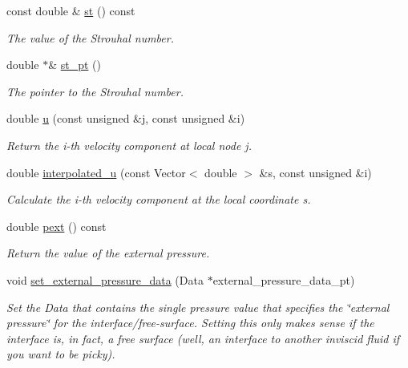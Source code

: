 \begin{DoxyCompactItemize}
const double \& \hyperlink{classoomph_1_1FluidInterfaceElement_a0c55c0e3cff597363ecb9ab0869c0015}{st} () const
\begin{DoxyCompactList}\small\item\em The value of the Strouhal number. \end{DoxyCompactList}\item 
double $\ast$\& \hyperlink{classoomph_1_1FluidInterfaceElement_a3fa462bb0ff807cf655ba02b35c1ccb4}{st\+\_\+pt} ()
\begin{DoxyCompactList}\small\item\em The pointer to the Strouhal number. \end{DoxyCompactList}\item 
double \hyperlink{classoomph_1_1FluidInterfaceElement_a50a509413ea7f2a481678837846dd476}{u} (const unsigned \&j, const unsigned \&i)
\begin{DoxyCompactList}\small\item\em Return the i-\/th velocity component at local node j. \end{DoxyCompactList}\item 
double \hyperlink{classoomph_1_1FluidInterfaceElement_a8f807a6456da7785b12e45a4c17fb969}{interpolated\+\_\+u} (const Vector$<$ double $>$ \&s, const unsigned \&i)
\begin{DoxyCompactList}\small\item\em Calculate the i-\/th velocity component at the local coordinate s. \end{DoxyCompactList}\item 
double \hyperlink{classoomph_1_1FluidInterfaceElement_a7c0a2a21afce911c301c75febd3ba44c}{pext} () const
\begin{DoxyCompactList}\small\item\em Return the value of the external pressure. \end{DoxyCompactList}\item 
void \hyperlink{classoomph_1_1FluidInterfaceElement_a7230ddea36eb36938d64583e5ee4b15f}{set\+\_\+external\+\_\+pressure\+\_\+data} (Data $\ast$external\+\_\+pressure\+\_\+data\+\_\+pt)
\begin{DoxyCompactList}\small\item\em Set the Data that contains the single pressure value that specifies the \char`\"{}external pressure\char`\"{} for the interface/free-\/surface. Setting this only makes sense if the interface is, in fact, a free surface (well, an interface to another inviscid fluid if you want to be picky). \end{DoxyCompactList}\item 

\end{DoxyCompactItemize}
